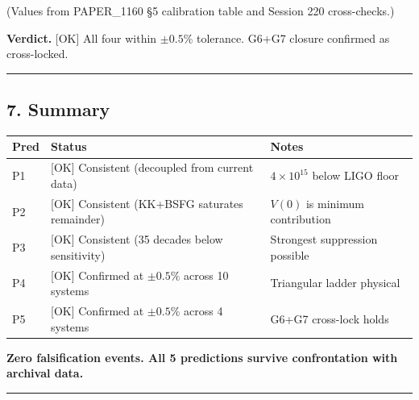 \documentclass[
]{article}
\newcounter{none} %
\begin{document}
(Values from PAPER\_1160 §5 calibration table and Session 220
cross-checks.)

\textbf{Verdict.} {[}OK{]} All four within \(\pm 0.5\%\) tolerance.
G6+G7 closure confirmed as cross-locked.

\begin{center}\rule{0.5\linewidth}{0.5pt}\end{center}

\subsection{7. Summary}\label{summary}

{\def\LTcaptype{none} %
\begin{longtable}[]{@{}
  >{\raggedright\arraybackslash}p{}
  >{\raggedright\arraybackslash}p{}
  >{\raggedright\arraybackslash}p{}@{}}
\toprule\noalign{}
\begin{minipage}[b]{\linewidth}\raggedright
Pred
\end{minipage} & \begin{minipage}[b]{\linewidth}\raggedright
Status
\end{minipage} & \begin{minipage}[b]{\linewidth}\raggedright
Notes
\end{minipage} \\
\midrule\noalign{}
\endhead
\bottomrule\noalign{}
\endlastfoot
P1 & {[}OK{]} Consistent (decoupled from current data) &
\(4\times 10^{15}\) below LIGO floor \\
P2 & {[}OK{]} Consistent (KK+BSFG saturates remainder) & \(V(0)\) is
minimum contribution \\
P3 & {[}OK{]} Consistent (35 decades below sensitivity) & Strongest
suppression possible \\
P4 & {[}OK{]} Confirmed at \(\pm 0.5\%\) across 10 systems & Triangular
ladder physical \\
P5 & {[}OK{]} Confirmed at \(\pm 0.5\%\) across 4 systems & G6+G7
cross-lock holds \\
\end{longtable}
}

\textbf{Zero falsification events. All 5 predictions survive
confrontation with archival data.}

\begin{center}\rule{0.5\linewidth}{0.5pt}\end{center}
\end{document}
